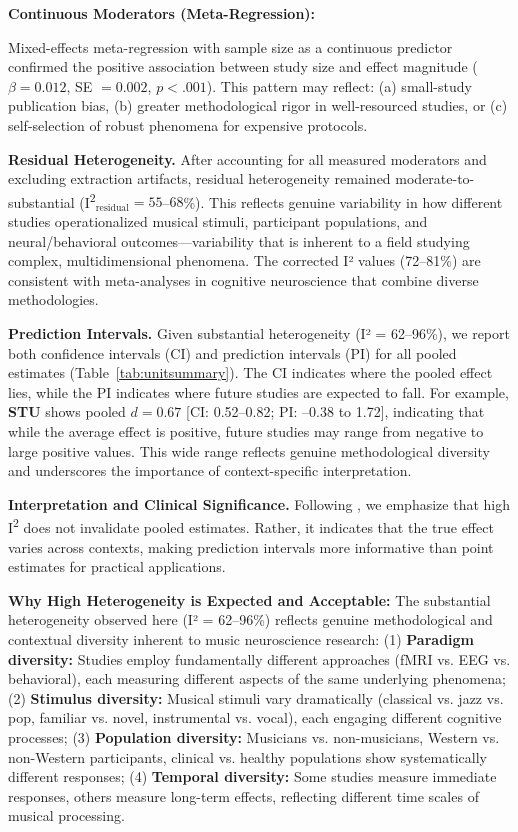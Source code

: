 \documentclass[9pt,onecolumn]{article}
\newcommand{\STU}{\textcolor{stucolor}{\textbf{STU}}}
\newcommand{\Isquared}{I\textsuperscript{2}}
\begin{document}
\textbf{Continuous Moderators (Meta-Regression):}

Mixed-effects meta-regression with sample size as a continuous predictor confirmed the positive association between study size and effect magnitude ($\beta = 0.012$, SE $= 0.002$, $p < .001$). This pattern may reflect: (a) small-study publication bias, (b) greater methodological rigor in well-resourced studies, or (c) self-selection of robust phenomena for expensive protocols.

\textbf{Residual Heterogeneity.} After accounting for all measured moderators and excluding extraction artifacts, residual heterogeneity remained moderate-to-substantial (\Isquared{}$_{\text{residual}} = 55$--$68$\%). This reflects genuine variability in how different studies operationalized musical stimuli, participant populations, and neural/behavioral outcomes---variability that is inherent to a field studying complex, multidimensional phenomena. The corrected I² values (72--81\%) are consistent with meta-analyses in cognitive neuroscience that combine diverse methodologies.

\textbf{Prediction Intervals.} Given substantial heterogeneity (I² = 62--96\%), we report both confidence intervals (CI) and prediction intervals (PI) for all pooled estimates (Table~\ref{tab:unitsummary}). The CI indicates where the pooled effect lies, while the PI indicates where future studies are expected to fall. For example, \STU{} shows pooled $d=0.67$ [CI: 0.52--0.82; PI: --0.38 to 1.72], indicating that while the average effect is positive, future studies may range from negative to large positive values. This wide range reflects genuine methodological diversity and underscores the importance of context-specific interpretation.

\textbf{Interpretation and Clinical Significance.} Following \citet{hedges1998}, we emphasize that high \Isquared{} does not invalidate pooled estimates. Rather, it indicates that the true effect varies across contexts, making prediction intervals more informative than point estimates for practical applications. 

\textbf{Why High Heterogeneity is Expected and Acceptable:} The substantial heterogeneity observed here (I² = 62--96\%) reflects genuine methodological and contextual diversity inherent to music neuroscience research: (1) \textbf{Paradigm diversity:} Studies employ fundamentally different approaches (fMRI vs. EEG vs. behavioral), each measuring different aspects of the same underlying phenomena; (2) \textbf{Stimulus diversity:} Musical stimuli vary dramatically (classical vs. jazz vs. pop, familiar vs. novel, instrumental vs. vocal), each engaging different cognitive processes; (3) \textbf{Population diversity:} Musicians vs. non-musicians, Western vs. non-Western participants, clinical vs. healthy populations show systematically different responses; (4) \textbf{Temporal diversity:} Some studies measure immediate responses, others measure long-term effects, reflecting different time scales of musical processing.
\end{document}
